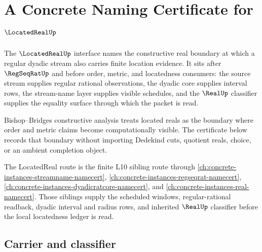\chapter{A Concrete Naming Certificate for $\LocatedRealUp$}
\label{ch:concrete-instances-locatedreal-namecert}

The $\LocatedRealUp$ interface names the constructive real boundary at which a regular dyadic stream also carries finite location evidence. It sits after $\RegSeqRatUp$ and before order, metric, and locatedness consumers: the source stream supplies regular rational observations, the dyadic core supplies interval rows, the stream-name layer supplies visible schedules, and the $\RealUp$ classifier supplies the equality surface through which the packet is read.

Bishop--Bridges constructive analysis treats located reals as the boundary where order and metric claims become computationally visible. The certificate below records that boundary without importing Dedekind cuts, quotient reals, choice, or an ambient completion object.

The LocatedReal route is the finite L10 sibling route through \autoref{ch:concrete-instances-streamname-namecert}, \autoref{ch:concrete-instances-regseqrat-namecert}, \autoref{ch:concrete-instances-dyadicratcore-namecert}, and \autoref{ch:concrete-instances-real-namecert}. Those siblings supply the scheduled windows, regular-rational readback, dyadic interval and radius rows, and inherited $\RealUp$ classifier before the local locatedness ledger is read.

\section{Carrier and classifier}
\label{sec:locatedreal-carrier-classifier}

